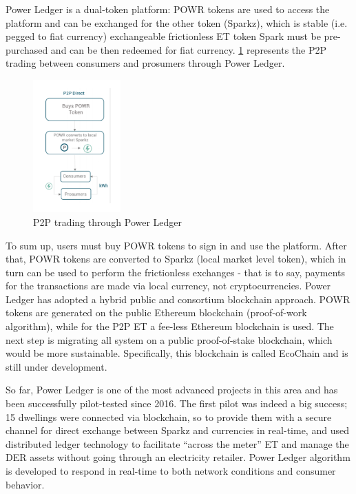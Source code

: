Power Ledger is a dual-token platform: POWR tokens are used to access the platform and can be exchanged for the other token (Sparkz), which is stable (i.e. pegged to fiat currency) exchangeable frictionless \ac{ET} token Spark must be pre-purchased \cite{powerledgerwhitepaper} and can be then redeemed for fiat currency. \cref{fig:plp2p} represents the \ac{P2P} trading between consumers and prosumers through Power Ledger. 




 \begin{figure}[h]
\centering
\includegraphics[width=0.3\textwidth]{./Images/plp2p}
\caption{\ac{P2P} trading through Power Ledger}
\label{fig:plp2p}
\end{figure}


To sum up, users must buy POWR tokens to sign in and use the platform. After that, POWR tokens are converted to Sparkz (local market level token), which in turn can be used to perform the frictionless exchanges - that is to say, payments for the transactions are made via local currency, not cryptocurrencies. Power Ledger has adopted a hybrid public and consortium blockchain approach. POWR tokens are generated on the public Ethereum blockchain (proof-of-work algorithm), while for the P2P \ac{ET} a fee-less Ethereum blockchain is used. The next step is migrating all system on a public proof-of-stake blockchain, which would be more sustainable. Specifically, this blockchain is called EcoChain and is still under development.



So far, Power Ledger is one of the most advanced projects in this area and has been successfully pilot-tested since 2016. The first pilot was indeed a big success; 15 dwellings were connected via blockchain, so to provide them with a secure channel for direct exchange between Sparkz and currencies in real-time, and used distributed ledger technology to facilitate “across the meter” \ac{ET} and manage the \ac{DER} assets without going through an electricity retailer. Power Ledger algorithm is developed to respond in real-time to both network conditions and consumer behavior.   


